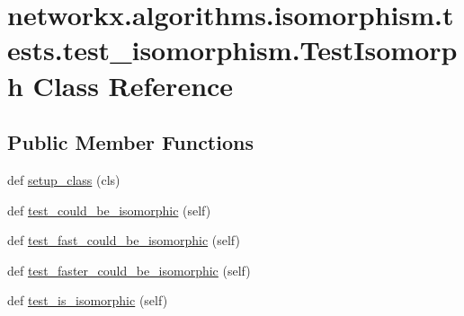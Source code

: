 \hypertarget{classnetworkx_1_1algorithms_1_1isomorphism_1_1tests_1_1test__isomorphism_1_1TestIsomorph}{}\section{networkx.\+algorithms.\+isomorphism.\+tests.\+test\+\_\+isomorphism.\+Test\+Isomorph Class Reference}
\label{classnetworkx_1_1algorithms_1_1isomorphism_1_1tests_1_1test__isomorphism_1_1TestIsomorph}
\subsection*{Public Member Functions}
\begin{DoxyCompactItemize}
\item 
def \hyperlink{classnetworkx_1_1algorithms_1_1isomorphism_1_1tests_1_1test__isomorphism_1_1TestIsomorph_a417a35964fbb51329a295165396b9ab2}{setup\+\_\+class} (cls)
\item 
def \hyperlink{classnetworkx_1_1algorithms_1_1isomorphism_1_1tests_1_1test__isomorphism_1_1TestIsomorph_acc1c47b763126b33e27ddde45ca4bfbe}{test\+\_\+could\+\_\+be\+\_\+isomorphic} (self)
\item 
def \hyperlink{classnetworkx_1_1algorithms_1_1isomorphism_1_1tests_1_1test__isomorphism_1_1TestIsomorph_ab3ec4112446ea9a645d96ee5ed85db9a}{test\+\_\+fast\+\_\+could\+\_\+be\+\_\+isomorphic} (self)
\item 
def \hyperlink{classnetworkx_1_1algorithms_1_1isomorphism_1_1tests_1_1test__isomorphism_1_1TestIsomorph_a5bf3101400d1777ab90ac4bc3930023e}{test\+\_\+faster\+\_\+could\+\_\+be\+\_\+isomorphic} (self)
\item 
def \hyperlink{classnetworkx_1_1algorithms_1_1isomorphism_1_1tests_1_1test__isomorphism_1_1TestIsomorph_a57a2396b3f6da282071699f88a24a75b}{test\+\_\+is\+\_\+isomorphic} (self)
\end{DoxyCompactItemize}
